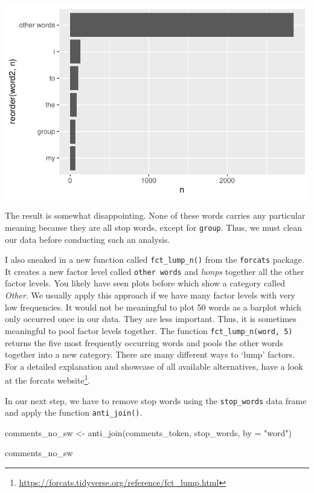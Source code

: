 \documentclass[
  letterpaper,
]{krantz}
\makeatletter
\newenvironment{Shaded}{\begin{snugshade}}{\end{snugshade}}
\newcommand{\AttributeTok}[1]{\textcolor[rgb]{0.40,0.45,0.13}{#1}}
\newcommand{\FunctionTok}[1]{\textcolor[rgb]{0.28,0.35,0.67}{#1}}
\newcommand{\NormalTok}[1]{\textcolor[rgb]{0.00,0.23,0.31}{#1}}
\newcommand{\OtherTok}[1]{\textcolor[rgb]{0.00,0.23,0.31}{#1}}
\newcommand{\StringTok}[1]{\textcolor[rgb]{0.13,0.47,0.30}{#1}}
\renewcommand{\href}[2]{#2\footnote{\url{#1}}}
\newenvironment{kframe}{%
\medskip{}
\setlength{\fboxsep}{.8em}
 \def\at@end@of@kframe{}%
 \ifinner\ifhmode%
  \def\at@end@of@kframe{\end{minipage}}%
  \begin{minipage}{\columnwidth}%
 \fi\fi%
 \def\FrameCommand##1{\hskip\@totalleftmargin \hskip-\fboxsep
 \colorbox{shadecolor}{##1}\hskip-\fboxsep
     \hskip-\linewidth \hskip-\@totalleftmargin \hskip\columnwidth}%
 \MakeFramed {\advance\hsize-\width
   \@totalleftmargin\z@ \linewidth\hsize
   \@setminipage}}%
 {\par\unskip\endMakeFramed%
 \at@end@of@kframe}
\renewenvironment{Shaded}{\begin{kframe}}{\end{kframe}}
\makeatother
\begin{document}
\includegraphics{14_mixed_methods_files/figure-pdf/freq-words-before-stopwords-removal-1.pdf}

The result is somewhat disappointing. None of these words carries any
particular meaning because they are all stop words, except for
\texttt{group}. Thus, we must clean our data before conducting such an
analysis.

I also sneaked in a new function called \texttt{fct\_lump\_n()} from the
\texttt{forcats} package. It creates a new factor level called
\texttt{other\ words} and \emph{lumps} together all the other factor
levels. You likely have seen plots before which show a category called
\emph{Other}. We usually apply this approach if we have many factor
levels with very low frequencies. It would not be meaningful to plot 50
words as a barplot which only occurred once in our data. They are less
important. Thus, it is sometimes meaningful to pool factor levels
together. The function \texttt{fct\_lump\_n(word,\ 5)} returns the five
most frequently occurring words and pools the other words together into
a new category. There are many different ways to `lump' factors. For a
detailed explanation and showcase of all available alternatives, have a
look at the
\href{https://forcats.tidyverse.org/reference/fct_lump.html}{forcats
website}.

In our next step, we have to remove stop words using the
\texttt{stop\_words} data frame and apply the function
\texttt{anti\_join()}.

\begin{Shaded}
\begin{Highlighting}[]
\NormalTok{comments\_no\_sw }\OtherTok{\textless{}{-}} \FunctionTok{anti\_join}\NormalTok{(comments\_token, stop\_words,}
                          \AttributeTok{by =} \StringTok{"word"}\NormalTok{)}

\NormalTok{comments\_no\_sw}
\end{Highlighting}
\end{Shaded}
\end{document}
